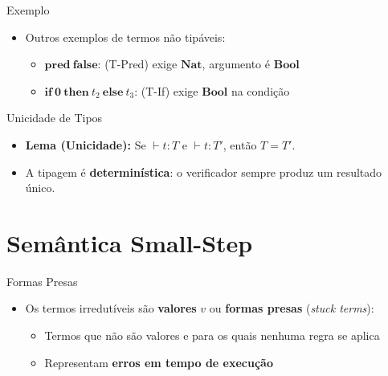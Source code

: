 \begin{frame}{Exemplo}

    \begin{itemize}

        \item
        Outros exemplos de termos não tipáveis:

        \begin{itemize}

            \item
            \(\mathbf{pred}\ \mathbf{false}\): (T-Pred) exige \(\mathbf{Nat}\),
            argumento é \(\mathbf{Bool}\)
            \item
            \(\mathbf{if}\ \mathbf{0}\ \mathbf{then}\ t_2\ \mathbf{else}\ t_3\):
            (T-If) exige \(\mathbf{Bool}\) na condição
        \end{itemize}
    \end{itemize}
\end{frame}

\begin{frame}{Unicidade de Tipos}

    \begin{itemize}
        \item
        \textbf{Lema (Unicidade):} Se \(\vdash t : T\) e \(\vdash t : T'\),
        então \(T = T'\).
        \item
        A tipagem é \textbf{determinística}: o verificador sempre produz um
        resultado único.
    \end{itemize}
\end{frame}


\section{Semântica Small-Step}\label{semuxe2ntica-small-step}

\begin{frame}{Formas Presas}

    \begin{itemize}

        \item
        Os termos irredutíveis são \textbf{valores} \(v\) ou \textbf{formas
        presas} (\emph{stuck terms}):

        \begin{itemize}

            \item
            Termos que não são valores e para os quais nenhuma regra se aplica
            \item
            Representam \textbf{erros em tempo de execução}
        \end{itemize}
    \end{itemize}
\end{frame}

